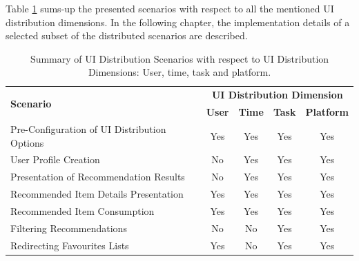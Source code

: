 Table \ref{tab:table31}  sums-up the presented scenarios with respect to all the mentioned UI distribution dimensions. In the following chapter, the implementation details of a selected subset of the distributed scenarios are described.
\begin{table}[position specifier]
  \centering
  \begin{tabular}{ |l|c|c|c|c| }
  \hline
  \multirow{2}{*}{\textbf{Scenario}} &\multicolumn{4}{c|}{\textbf{UI Distribution Dimension}} \\
  \cline{2-5}
   & \textbf{User} & \textbf{Time} & \textbf{Task} & \textbf{Platform} \\
   \hline
   Pre-Configuration of UI Distribution Options & Yes & Yes & Yes & Yes \\
   \hline
   User Profile Creation & No & Yes & Yes & Yes \\
   \hline
   Presentation of Recommendation Results & No & Yes & Yes & Yes \\
   \hline
   Recommended Item Details Presentation & Yes & Yes & Yes & Yes \\
   \hline
   Recommended Item Consumption & Yes & Yes & Yes & Yes \\
   \hline
   Filtering Recommendations & No & No & Yes & Yes \\
   \hline
   Redirecting Favourites Lists & Yes & No & Yes & Yes \\
   \hline
   \end{tabular}
   \caption{Summary of UI Distribution Scenarios with respect to UI Distribution Dimensions: User, time, task and platform.}
   \label{tab:table31}  
\end{table}

  



